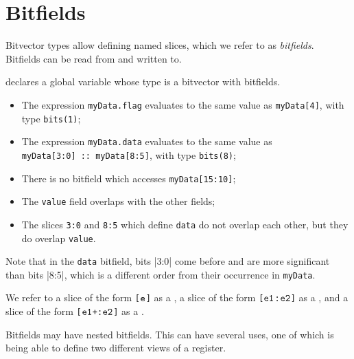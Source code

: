 \chapter{Bitfields\label{chap:Bitfields}}

\hypertarget{bitfieldterm}{}
Bitvector types allow defining named slices, which we refer to as \emph{bitfields}.
Bitfields can be read from and written to.

 declares a global variable whose type is a bitvector with bitfields.
\begin{itemize}
  \item The expression \texttt{myData.flag} evaluates to the same value as \verb|myData[4]|, with type \verb|bits(1)|;
  \item The expression \texttt{myData.data} evaluates to the same value as\\ \verb|myData[3:0] :: myData[8:5]|, with type \verb|bits(8)|;
  \item There is no bitfield which accesses \verb|myData[15:10]|;
  \item The \verb|value| field overlaps with the other fields;
  \item The slices \verb|3:0| and \verb|8:5| which define \texttt{data} do not overlap each other,
        but they do overlap \verb|value|.
\end{itemize}
Note that in the \texttt{data} bitfield, bits |3:0| come before and are more significant than
bits |8:5|, which is a different order from their occurrence in \texttt{myData}.

\hypertarget{def-singleslice}{}
\hypertarget{def-rangeslice}{}
\hypertarget{def-lengthslice}{}
We refer to a slice of the form \texttt{[$\texttt{e}$]} as a \singleslice,
a slice of the form \texttt{[$\texttt{e1}$:$\texttt{e2}$]} as a \rangeslice,
and a slice of the form \texttt{[$\texttt{e1}$+:$\texttt{e2}$]} as a \lengthslice.

\ChapterOutline

Bitfields may have nested bitfields. This can have several uses, one of which is being able to define two
different views of a register.

